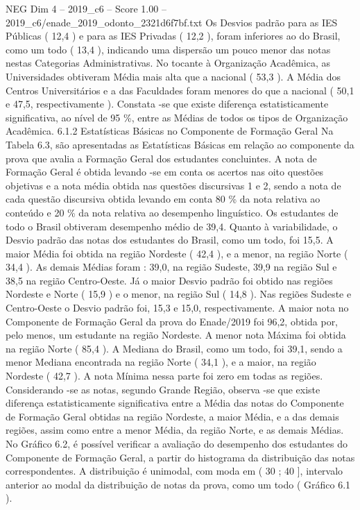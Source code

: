 \begin{textsample}{NEG Dim 4 – 2019\_c6 – Score 1.00 – 2019\_c6/enade\_2019\_odonto\_2321d6f7bf.txt}
Os Desvios padrão para as IES Públicas ( 12,4 ) e para as IES Privadas ( 12,2 ), foram inferiores ao do Brasil, como um todo ( 13,4 ), indicando uma dispersão um pouco menor das notas nestas Categorias Administrativas.
No tocante à Organização Acadêmica, as Universidades obtiveram Média mais alta que a nacional ( 53,3 ).
A Média dos Centros Universitários e a das Faculdades foram menores do que a nacional ( 50,1 e 47,5, respectivamente ).
Constata -se que existe diferença estatisticamente significativa, ao nível de 95 \%, entre as Médias de todos os tipos de Organização Acadêmica. 6.1.2 Estatísticas Básicas no Componente de Formação Geral Na Tabela 6.3, são apresentadas as Estatísticas Básicas em relação ao componente da prova que avalia a Formação Geral dos estudantes concluintes.
A nota de Formação Geral é obtida levando -se em conta os acertos nas oito questões objetivas e a nota média obtida nas questões discursivas 1 e 2, sendo a nota de cada questão discursiva obtida levando em conta 80 \% da nota relativa ao conteúdo e 20 \% da nota relativa ao desempenho linguístico.
Os estudantes de todo o Brasil obtiveram desempenho médio de 39,4.
Quanto à variabilidade, o Desvio padrão das notas dos estudantes do Brasil, como um todo, foi 15,5.
A maior Média foi obtida na região Nordeste ( 42,4 ), e a menor, na região Norte ( 34,4 ).
As demais Médias foram : 39,0, na região Sudeste, 39,9 na região Sul e 38,5 na região Centro-Oeste.
Já o maior Desvio padrão foi obtido nas regiões Nordeste e Norte ( 15,9 ) e o menor, na região Sul ( 14,8 ).
Nas regiões Sudeste e Centro-Oeste o Desvio padrão foi, 15,3 e 15,0, respectivamente.
A maior nota no Componente de Formação Geral da prova do Enade/2019 foi 96,2, obtida por, pelo menos, um estudante na região Nordeste.
A menor nota Máxima foi obtida na região Norte ( 85,4 ).
A Mediana do Brasil, como um todo, foi 39,1, sendo a menor Mediana encontrada na região Norte ( 34,1 ), e a maior, na região Nordeste ( 42,7 ).
A nota Mínima nessa parte foi zero em todas as regiões.
Considerando -se as notas, segundo Grande Região, observa -se que existe diferença estatisticamente significativa entre a Média das notas do Componente de Formação Geral obtidas na região Nordeste, a maior Média, e a das demais regiões, assim como entre a menor Média, da região Norte, e as demais Médias.
No Gráfico 6.2, é possível verificar a avaliação do desempenho dos estudantes do Componente de Formação Geral, a partir do histograma da distribuição das notas correspondentes.
A distribuição é unimodal, com moda em ( 30 ; 40 ], intervalo anterior ao modal da distribuição de notas da prova, como um todo ( Gráfico 6.1 ).

\end{textsample}
